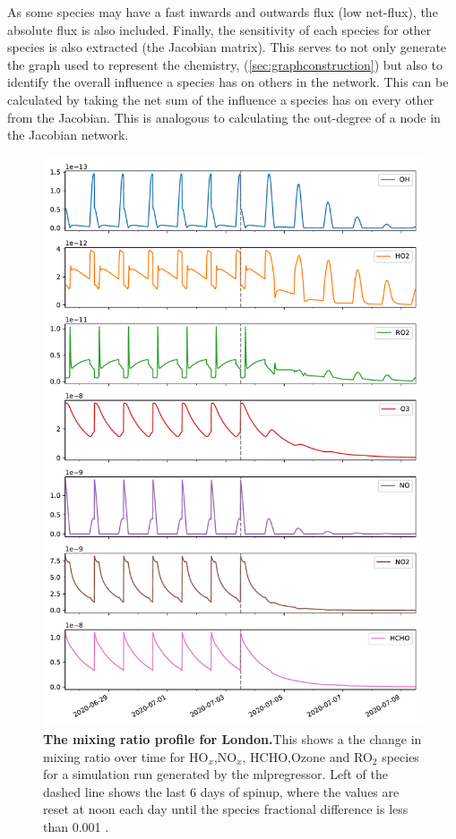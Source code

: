As some species may have a fast inwards and outwards flux (low net-flux), the absolute flux is also included. Finally, the sensitivity of each species for other species is also extracted (the Jacobian matrix). This serves to not only generate the graph used to represent the chemistry, (\autoref{sec:graphconstruction}) but also to identify the overall influence a species has on others in the network. This can be calculated by taking the net sum of the influence a species has on every other from the Jacobian. This is analogous to calculating the out-degree of a node in the Jacobian network.\\



%

%
%
%



\begin{figure}[H]
    \centering
\includegraphics[width=.9\textwidth]{figures_c3/mlpregressor/conc_clfo.pdf}
\caption{\textbf{The mixing ratio profile for London.}This shows a the change in mixing ratio over time for HO$_x$,NO$_x$, HCHO,Ozone and RO$_2$ species for a simulation run generated by the mlpregressor. Left of the dashed line shows the last 6 days of spinup, where the values are reset at noon each day until the species fractional difference is less than 0.001 .}
\label{fig:clondon}
\end{figure}

